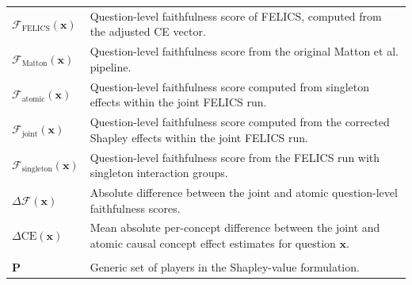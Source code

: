 \begin{longtable}{@{}>{\raggedright\arraybackslash}p{} p{}@{}}
	$\mathcal{F}_{\mathrm{FELICS}}(\mathbf{x})$        & Question-level faithfulness score of FELICS, computed from the adjusted CE vector.                                                                                                                    \\
	$\mathcal{F}_{\mathrm{Matton}}(\mathbf{x})$        & Question-level faithfulness score from the original Matton et al. \cite{mattonWalkTalkMeasuring2024} pipeline.                                                                                        \\
	$\mathcal{F}_{\mathrm{atomic}}(\mathbf{x})$        & Question-level faithfulness score computed from singleton effects within the joint FELICS run.                                                                                                        \\
	$\mathcal{F}_{\mathrm{joint}}(\mathbf{x})$         & Question-level faithfulness score computed from the corrected Shapley effects within the joint FELICS run.                                                                                            \\
	$\mathcal{F}_{\mathrm{singleton}}(\mathbf{x})$     & Question-level faithfulness score from the FELICS run with singleton interaction groups.                                                                                                              \\
	$\Delta\mathcal{F}(\mathbf{x})$                    & Absolute difference between the joint and atomic question-level faithfulness scores.                                                                                                                  \\
	$\Delta\mathrm{CE}(\mathbf{x})$                    & Mean absolute per-concept difference between the joint and atomic causal concept effect estimates for question $\mathbf{x}$.                                                                          \\
	\hline
	\multicolumn{2}{@{}l}{\textbf{Shapley-Value Notation}}                                                                                                                                                                                                     \\
	\hline
	$\mathbf{P}$                                       & Generic set of players in the Shapley-value formulation.                                                                                                                                              \\

\end{longtable}
